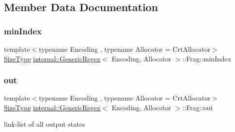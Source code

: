 \subsection{Member Data Documentation}
\mbox{\label{structinternal_1_1GenericRegex_1_1Frag_a8007c1e6c879d1fe3eec2327fed0c664}} 
\subsubsection{\texorpdfstring{min\+Index}{minIndex}}
{\footnotesize\ttfamily template$<$typename Encoding , typename Allocator  = Crt\+Allocator$>$ \\
\hyperlink{rapidjson_8h_a5ed6e6e67250fadbd041127e6386dcb5}{Size\+Type} \hyperlink{classinternal_1_1GenericRegex}{internal\+::\+Generic\+Regex}$<$ Encoding, Allocator $>$\+::Frag\+::min\+Index}

\mbox{\label{structinternal_1_1GenericRegex_1_1Frag_a48b23d866d56328e05c187de2d7443d2}} 
\subsubsection{\texorpdfstring{out}{out}}
{\footnotesize\ttfamily template$<$typename Encoding , typename Allocator  = Crt\+Allocator$>$ \\
\hyperlink{rapidjson_8h_a5ed6e6e67250fadbd041127e6386dcb5}{Size\+Type} \hyperlink{classinternal_1_1GenericRegex}{internal\+::\+Generic\+Regex}$<$ Encoding, Allocator $>$\+::Frag\+::out}



link-\/list of all output states 

\mbox{\label{structinternal_1_1GenericRegex_1_1Frag_adec8170ccdf14bfc3138a4df0b2e4abd}} 
